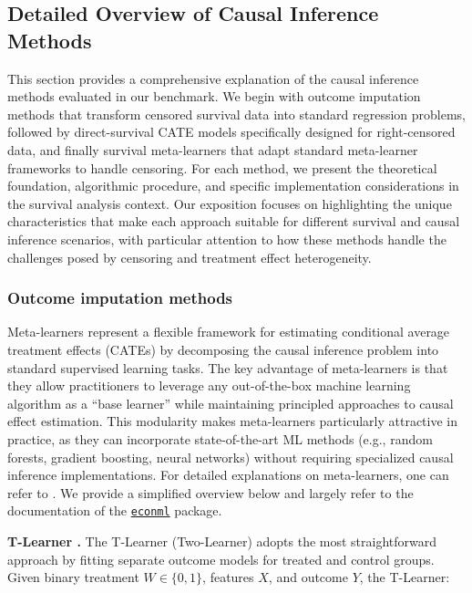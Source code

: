 \subsection{Detailed Overview of Causal Inference Methods}
\label{ch04:app:causal_method_details}

This section provides a comprehensive explanation of the causal inference methods evaluated in our benchmark.
We begin with outcome imputation methods that transform censored survival data into standard regression problems, followed by direct-survival CATE models specifically designed for right-censored data, and finally survival meta-learners that adapt standard meta-learner frameworks to handle censoring.
For each method, we present the theoretical foundation, algorithmic procedure, and specific implementation considerations in the survival analysis context.
Our exposition focuses on highlighting the unique characteristics that make each approach suitable for different survival and causal inference scenarios, with particular attention to how these methods handle the challenges posed by censoring and treatment effect heterogeneity.


\subsubsection{Outcome imputation methods}
Meta-learners represent a flexible framework for estimating conditional average treatment effects (CATEs) by decomposing the causal inference problem into standard supervised learning tasks.
The key advantage of meta-learners is that they allow practitioners to leverage any out-of-the-box machine learning algorithm as a ``base learner'' while maintaining principled approaches to causal effect estimation.
This modularity makes meta-learners particularly attractive in practice, as they can incorporate state-of-the-art ML methods (e.g., random forests, gradient boosting, neural networks) without requiring specialized causal inference implementations.
For detailed explanations on meta-learners, one can refer to \citet{ch04:kunzel2019metalearners,kennedy2023towards}.
We provide a simplified overview below and largely refer to the documentation of the \href{https://econml.azurewebsites.net/spec/spec.html}{\texttt{econml}} package.

\textbf{T-Learner \citep{ch04:kunzel2019metalearners}.}
The T-Learner (Two-Learner) adopts the most straightforward approach by fitting separate outcome models for treated and control groups.
Given binary treatment $W \in \{0,1\}$, features $X$, and outcome $Y$, the T-Learner:

